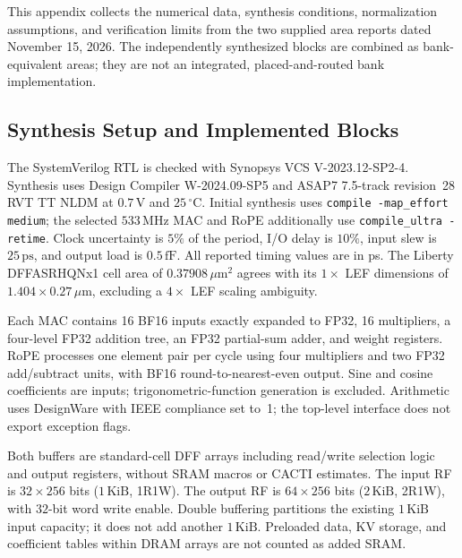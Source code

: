 \clearpage
{}
\label{app:area-overhead}
This appendix collects the numerical data, synthesis conditions, normalization assumptions, and verification limits from the two supplied area reports dated November 15, 2026. The independently synthesized blocks are combined as bank-equivalent areas; they are not an integrated, placed-and-routed bank implementation.

\subsection{Synthesis Setup and Implemented Blocks}
The SystemVerilog RTL is checked with Synopsys VCS V-2023.12-SP2-4. Synthesis uses Design Compiler W-2024.09-SP5 and ASAP7 7.5-track revision~28 RVT TT NLDM at $0.7\,\mathrm{V}$ and $25\,^{\circ}\mathrm{C}$. Initial synthesis uses \texttt{compile -map\_effort medium}; the selected $533\,\mathrm{MHz}$ MAC and RoPE additionally use \texttt{compile\_ultra -retime}. Clock uncertainty is $5\%$ of the period, I/O delay is $10\%$, input slew is $25\,\mathrm{ps}$, and output load is $0.5\,\mathrm{fF}$. All reported timing values are in ps. The Liberty DFFASRHQNx1 cell area of $0.37908\,\mu\mathrm{m}^{2}$ agrees with its $1\times$ LEF dimensions of $1.404\times0.27\,\mu\mathrm{m}$, excluding a $4\times$ LEF scaling ambiguity.

Each MAC contains 16 BF16 inputs exactly expanded to FP32, 16 multipliers, a four-level FP32 addition tree, an FP32 partial-sum adder, and weight registers. RoPE processes one element pair per cycle using four multipliers and two FP32 add/subtract units, with BF16 round-to-nearest-even output. Sine and cosine coefficients are inputs; trigonometric-function generation is excluded. Arithmetic uses DesignWare with IEEE compliance set to~1; the top-level interface does not export exception flags.

Both buffers are standard-cell DFF arrays including read/write selection logic and output registers, without SRAM macros or CACTI estimates. The input RF is $32\times256$ bits ($1\,\mathrm{KiB}$, 1R1W). The output RF is $64\times256$ bits ($2\,\mathrm{KiB}$, 2R1W), with $32$-bit word write enable. Double buffering partitions the existing $1\,\mathrm{KiB}$ input capacity; it does not add another $1\,\mathrm{KiB}$. Preloaded data, KV storage, and coefficient tables within DRAM arrays are not counted as added SRAM.

